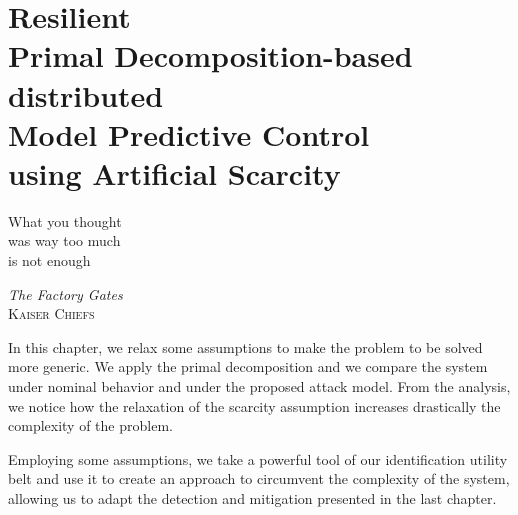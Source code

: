 \documentclass[../main.tex]{subfiles}
\begin{document}
\chapter[Resilient Primal Decomposition-based dMPC using Artificial Scarcity]{Resilient \\Primal Decomposition-based \\distributed \\Model Predictive Control\\using Artificial Scarcity}\label{sec:safe_pddmpc_ineq}
\epigraph{\centering What you thought\\ was way too much\\ is not enough}
{\textit{The Factory Gates}\\\textsc{Kaiser Chiefs}}

In this chapter, we relax some assumptions to make the problem to be solved more generic.
We apply the primal decomposition and we compare the system under nominal behavior and under the proposed attack model.
From the analysis, we notice how the relaxation of the scarcity assumption increases drastically the complexity of the problem.

Employing some assumptions, we take a powerful tool of our identification utility belt and use it to create an approach to circumvent the complexity of the system, allowing us to adapt the detection and mitigation presented in the last chapter.

\minitoc
\end{document}
